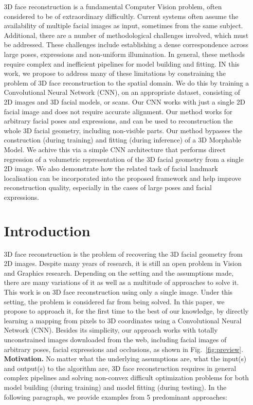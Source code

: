 3D face reconstruction is a fundamental Computer Vision problem, often
considered to be of extraordinary difficultly. Current systems often
assume the availability of multiple facial images as input, sometimes
from the same subject. Additional, there are a number of
methodological challenges involved, which must be addressed. These
challenges include establishing a dense correspondence across large
poses, expressions and non-uniform illumination. In general, these
methods require complex and inefficient pipelines for model building
and fitting. IN this work, we propose to address many of these
limitations by constraining the problem of 3D face reconstruction to
the spatial domain. We do this by training a Convolutional Neural
Network (CNN), on an appropriate dataset, consisting of 2D images and
3D facial models, or scans. Our CNN works with just a single 2D facial
image and does not require accurate alignment. Our method works for
arbitrary facial poses and expressions, and can be used to
reconstruction the whole 3D facial geometry, including non-visible
parts. Our method bypasses the construction (during training) and
fitting (during inference) of a 3D Morphable Model. We achive this via
a simple CNN architecture that performs direct regression of a
volumetric representation of the 3D facial geometry from a single 2D
image. We also demonstrate how the related task of facial landmark
localisation can be incorporated into the proposed framework and help
improve reconstruction quality, especially in the cases of large poses
and facial expressions.


\section{Introduction}
3D face reconstruction is the problem of recovering the 3D facial
geometry from 2D images. Despite many years of research, it is still
an open problem in Vision and Graphics research. Depending on the
setting and the assumptions made, there are many variations of it as
well as a multitude of approaches to solve it. This work is on 3D face
reconstruction using only a single image. Under this setting, the
problem is considered far from being solved. In this paper, we propose
to approach it, for the first time to the best of our knowledge, by
directly learning a mapping from pixels to 3D coordinates using a
Convolutional Neural Network (CNN). Besides its simplicity, our
approach works with totally unconstrained images downloaded from the
web, including facial images of arbitrary poses, facial expressions
and occlusions, as shown in Fig.~\ref{fig:preview}. \newline
\textbf{Motivation.} No matter what the underlying assumptions are,
what the input(s) and output(s) to the algorithm are, 3D face
reconstruction requires in general complex pipelines and solving
non-convex difficult optimization problems for both model building
(during training) and model fitting (during testing). In the following
paragraph, we provide examples from 5 predominant approaches:

